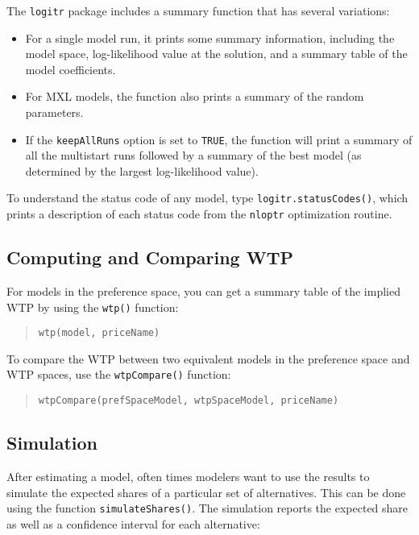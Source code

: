 \documentclass[article]{jss}
\providecommand{\tightlist}{%
  \setlength{\itemsep}{0pt}\setlength{\parskip}{0pt}}
\begin{document}
The \texttt{logitr} package includes a summary function that has several
variations:

\begin{itemize}
\tightlist
\item
  For a single model run, it prints some summary information, including
  the model space, log-likelihood value at the solution, and a summary
  table of the model coefficients.
\item
  For MXL models, the function also prints a summary of the random
  parameters.
\item
  If the \texttt{keepAllRuns} option is set to \texttt{TRUE}, the
  function will print a summary of all the multistart runs followed by a
  summary of the best model (as determined by the largest log-likelihood
  value).
\end{itemize}

To understand the status code of any model, type
\texttt{logitr.statusCodes()}, which prints a description of each status
code from the \texttt{nloptr} optimization routine.

\hypertarget{computing-and-comparing-wtp}{%
\subsection{Computing and Comparing
WTP}\label{computing-and-comparing-wtp}}

For models in the preference space, you can get a summary table of the
implied WTP by using the \texttt{wtp()} function:

\begin{quote}
\texttt{wtp(model,\ priceName)}
\end{quote}

To compare the WTP between two equivalent models in the preference space
and WTP spaces, use the \texttt{wtpCompare()} function:

\begin{quote}
\texttt{wtpCompare(prefSpaceModel,\ wtpSpaceModel,\ priceName)}
\end{quote}

\hypertarget{simulation}{%
\subsection{Simulation}\label{simulation}}

After estimating a model, often times modelers want to use the results
to simulate the expected shares of a particular set of alternatives.
This can be done using the function \texttt{simulateShares()}. The
simulation reports the expected share as well as a confidence interval
for each alternative:
\end{document}
